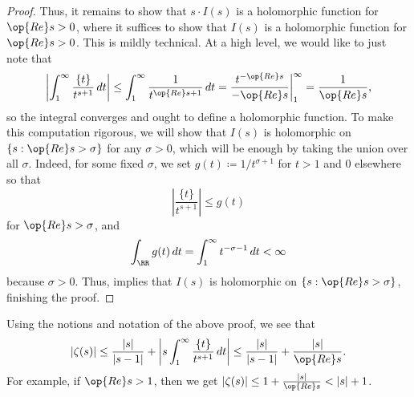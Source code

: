 \documentclass[../notes.tex]{subfiles}
\begin{document}
\begin{proof}
	Thus, it remains to show that $s\cdot I(s)$ is a holomorphic function for $\op{Re}s>0$, where it suffices to show that $I(s)$ is a holomorphic function for $\op{Re}s>0$. This is mildly technical. At a high level, we would like to just note that
	\[\left|\int_1^\infty\frac{\{t\}}{t^{s+1}}\,dt\right|\le\int_1^\infty\frac{1}{t^{\op{Re}s+1}}\,dt=\frac{t^{-\op{Re}s}}{-\op{Re}s}\bigg|_1^\infty=\frac1{\op{Re}s},\]
	so the integral converges and ought to define a holomorphic function. To make this computation rigorous, we will show that $I(s)$ is holomorphic on $\{s:\op{Re}s>\sigma\}$ for any $\sigma>0$, which will be enough by taking the union over all $\sigma$. Indeed, for some fixed $\sigma$, we set $g(t)\coloneqq1/t^{\sigma+1}$ for $t>1$ and $0$ elsewhere so that
	\[\left|\frac{\{t\}}{t^{s+1}}\right|\le g(t)\]
	for $\op{Re}s>\sigma$, and
	\[\int_\RR g(t)\,dt=\int_1^\infty t^{-\sigma-1}\,dt<\infty\]
	because $\sigma>0$. Thus,  implies that $I(s)$ is holomorphic on $\{s:\op{Re}s>\sigma\}$, finishing the proof.
\end{proof}
\begin{remark} \label{rem:bound-zeta}
	Using the notions and notation of the above proof, we see that
	\[|\zeta(s)|\le\frac{|s|}{|s-1|}+\left|s\int_1^\infty\frac{\{t\}}{t^{s+1}}\,dt\right|\le\frac{|s|}{|s-1|}+\frac{|s|}{\op{Re}s}.\]
	For example, if $\op{Re}s>1$, then we get $|\zeta(s)|\le1+\frac{|s|}{\op{Re}s}<|s|+1$.
\end{remark}
\end{document}
